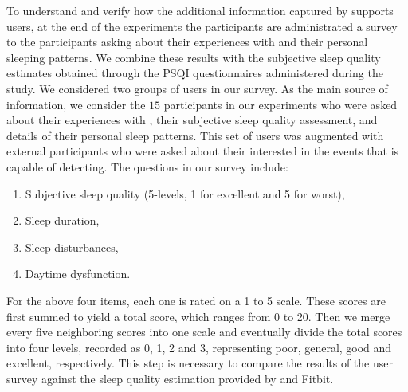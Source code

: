 To understand and verify how the additional information captured by {\systemname} supports users, at the end of the experiments the participants are administrated a survey to the participants asking about their experiences with {\systemname} and their personal sleeping patterns. We combine these results with the subjective sleep quality estimates obtained through the PSQI questionnaires administered during the study. We considered two groups of users in our survey. As the main source of information, we consider the $15$ participants in our experiments who were asked about their experiences with {\systemname}, their subjective sleep quality assessment, and details of their personal sleep patterns. This set of users was augmented with external participants who were asked about their interested in the events that {\systemname} is capable of detecting. The questions in our survey include:
\begin{enumerate}
  \item Subjective sleep quality (5-levels, 1 for excellent and 5 for worst),
  \item Sleep duration,
  \item Sleep disturbances,
  \item Daytime dysfunction.
\end{enumerate}
For the above four items, each one is rated on a 1 to 5 scale. These scores are first summed to yield a total score, which ranges from 0 to 20. Then we merge every five neighboring scores into one scale and eventually divide the total scores into four levels, recorded as 0, 1, 2 and 3, representing poor, general, good and excellent, respectively. This step is necessary to compare the results of the user survey against the sleep quality estimation provided by {\systemname} and Fitbit.

